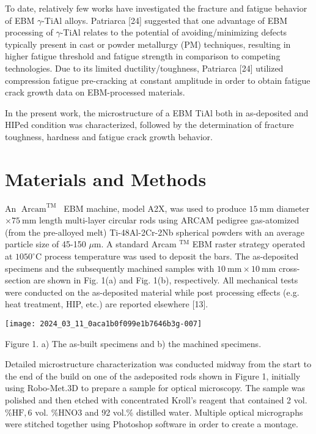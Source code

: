 \documentclass[10pt]{article}
\begin{document}
To date, relatively few works have investigated the fracture and fatigue behavior of EBM $\gamma$-TiAl alloys. Patriarca [24] suggested that one advantage of EBM processing of $\gamma$-TiAl relates to the potential of avoiding/minimizing defects typically present in cast or powder metallurgy (PM) techniques, resulting in higher fatigue threshold and fatigue strength in comparison to competing technologies. Due to its limited ductility/toughness, Patriarca [24] utilized compression fatigue pre-cracking at constant amplitude in order to obtain fatigue crack growth data on EBM-processed materials.

In the present work, the microstructure of a EBM TiAl both in as-deposited and HIPed condition was characterized, followed by the determination of fracture toughness, hardness and fatigue crack growth behavior.

\section*{Materials and Methods}
An $\operatorname{Arcam}^{\text {TM }}$ EBM machine, model A2X, was used to produce $15 \mathrm{~mm}$ diameter $\times 75 \mathrm{~mm}$ length multi-layer circular rods using ARCAM pedigree gas-atomized (from the pre-alloyed melt) Ti-48Al-2Cr-2Nb spherical powders with an average particle size of 45-150 $\mu \mathrm{m}$. A standard Arcam ${ }^{\mathrm{TM}}$ EBM raster strategy operated at $1050^{\circ} \mathrm{C}$ process temperature was used to deposit the bars. The as-deposited specimens and the subsequently machined samples with $10 \mathrm{~mm} \times 10 \mathrm{~mm}$ cross-section are shown in Fig. 1(a) and Fig. 1(b), respectively. All mechanical tests were conducted on the as-deposited material while post processing effects (e.g. heat treatment, HIP, etc.) are reported elsewhere [13].

\begin{center}
\texttt{[image: 2024\_03\_11\_0aca1b0f099e1b7646b3g-007]}
\end{center}

Figure 1. a) The as-built specimens and b) the machined specimens.

Detailed microstructure characterization was conducted midway from the start to the end of the build on one of the asdeposited rods shown in Figure 1, initially using Robo-Met.3D to prepare a sample for optical microscopy. The sample was polished and then etched with concentrated Kroll's reagent that contained 2 vol. $\% \mathrm{HF}, 6$ vol. $\% \mathrm{HNO} 3$ and 92 vol.\% distilled water. Multiple optical micrographs were stitched together using Photoshop software in order to create a montage.
\end{document}
